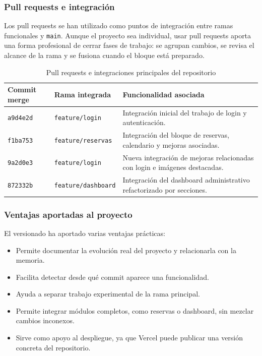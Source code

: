 \documentclass[11pt,a4paper]{article}
\begin{document}
\subsubsection{Pull requests e integración}
Los pull requests se han utilizado como puntos de integración entre ramas funcionales y \texttt{main}. Aunque el proyecto sea individual, usar pull requests aporta una forma profesional de cerrar fases de trabajo: se agrupan cambios, se revisa el alcance de la rama y se fusiona cuando el bloque está preparado.

\begin{table}[H]
\centering
\small
\begin{tabularx}{\textwidth}{|p{2.5cm}|p{3cm}|X|}
\hline
\textbf{Commit merge} & \textbf{Rama integrada} & \textbf{Funcionalidad asociada} \\
\hline
\texttt{a9d4e2d} & \texttt{feature/login} & Integración inicial del trabajo de login y autenticación. \\
\hline
\texttt{f1ba753} & \texttt{feature/reservas} & Integración del bloque de reservas, calendario y mejoras asociadas. \\
\hline
\texttt{9a2d0e3} & \texttt{feature/login} & Nueva integración de mejoras relacionadas con login e imágenes destacadas. \\
\hline
\texttt{872332b} & \texttt{feature/dashboard} & Integración del dashboard administrativo refactorizado por secciones. \\
\hline
\end{tabularx}
\caption{Pull requests e integraciones principales del repositorio}
\end{table}

\subsubsection{Ventajas aportadas al proyecto}
El versionado ha aportado varias ventajas prácticas:
\begin{itemize}[leftmargin=1.4cm]
  \item Permite documentar la evolución real del proyecto y relacionarla con la memoria.
  \item Facilita detectar desde qué commit aparece una funcionalidad.
  \item Ayuda a separar trabajo experimental de la rama principal.
  \item Permite integrar módulos completos, como reservas o dashboard, sin mezclar cambios inconexos.
  \item Sirve como apoyo al despliegue, ya que Vercel puede publicar una versión concreta del repositorio.
\end{itemize}
\end{document}
